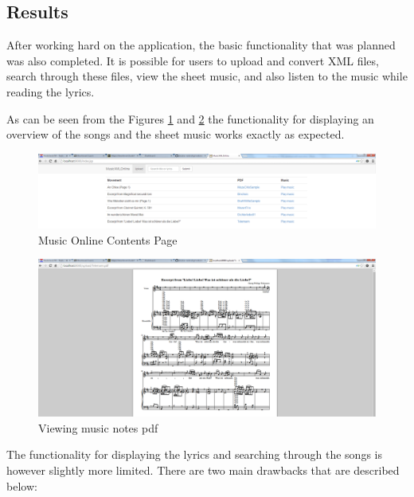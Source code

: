 \documentclass[MusicXML.tex]{subfiles}
\begin{document}
\subsection{Results}
After working hard on the application, the basic functionality that was planned was also completed. It is possible for users to upload and convert XML files, search through these files, view the sheet music, and also listen to the music while reading the lyrics. 

As can be seen from the Figures \ref{fig:musicindex} and \ref{fig:musicpdf} the functionality for displaying an overview of the songs and the sheet music works exactly as expected. 

\begin{figure} [H]
	\centering
	\includegraphics[width=1\textwidth]{./Figures/MusicXMLOnline-index.png}
	\caption{Music Online Contents Page}
	\label{fig:musicindex}
\end{figure}

\begin{figure} [H]
	\centering
	\includegraphics[width=1\textwidth]{./Figures/MusicXMLOnline-pdf.png}
	\caption{Viewing music notes pdf}
	\label{fig:musicpdf}
\end{figure}

The functionality for displaying the lyrics and searching through the songs is however slightly more limited. There are two main drawbacks that are described below:  
\end{document}
